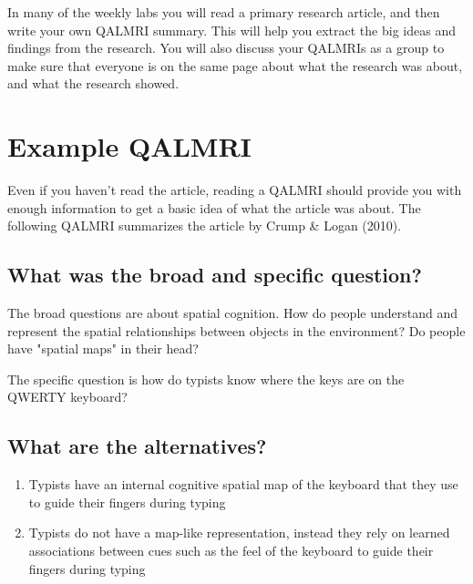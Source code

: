 In many of the weekly labs you will read a primary research article, and then write your own QALMRI summary. This will help you extract the big ideas and findings from the research. You will also discuss your QALMRIs as a group to make sure that everyone is on the same page about what the research was about, and what the research showed.

\section{Example QALMRI}

Even if you haven't read the article, reading a QALMRI should provide you with enough information to get a basic idea of what the article was about. The following QALMRI summarizes the article by Crump \& Logan (2010). \cite{crump_warning:_2010}

\subsection{What was the broad and specific question?}

The broad questions are about spatial cognition. How do people understand and represent the spatial relationships between objects in the environment? Do people have "spatial maps" in their head?

The specific question is how do typists know where the keys are on the QWERTY keyboard?

\subsection{What are the alternatives?}

\begin{enumerate}
\item Typists have an internal cognitive spatial map of the keyboard that they use to guide their fingers during typing
\item Typists do not have a map-like representation, instead they rely on learned associations between cues such as the feel of the keyboard to guide their fingers during typing
\end{enumerate}

